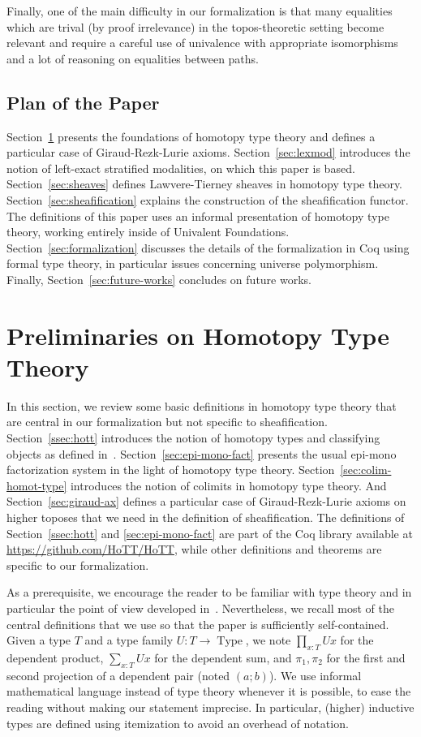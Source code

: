 \documentclass[conference]{IEEEtran}
\DeclareMathOperator{\Type}{Type}
\begin{document}
Finally, one of the main difficulty in our formalization is that many
equalities which are trival (by proof irrelevance) in the topos-theoretic
setting become relevant and require a careful use of univalence
with appropriate isomorphisms and a lot of reasoning on equalities
between paths.

\subsection{Plan of the Paper}

Section~\ref{sec:hott} presents the foundations of homotopy type theory
and defines a particular case of Giraud-Rezk-Lurie axioms. 
%
Section~\ref{sec:lexmod} introduces the notion of left-exact stratified
modalities, on which this paper is based.
%
Section~\ref{sec:sheaves} defines Lawvere-Tierney sheaves in homotopy
type theory.
%
Section~\ref{sec:sheafification} explains the construction of the
sheafification functor.
%
The definitions of this paper uses an informal presentation of
homotopy type theory, working entirely inside of Univalent
Foundations. 
Section~\ref{sec:formalization} discusses the details of the
formalization in Coq using formal type theory, in particular issues
concerning universe polymorphism.
%
Finally, Section~\ref{sec:future-works} concludes on future works.


\section{Preliminaries on Homotopy Type Theory}
\label{sec:hott}

In this section, we review some basic definitions in homotopy type
theory that are central in our formalization but not specific to
sheafification. 
%
Section~\ref{ssec:hott} introduces the notion of homotopy types and
classifying objects as defined in~\cite{sets_in_hott}.
%
Section~\ref{sec:epi-mono-fact} presents the usual epi-mono
factorization system in the light of homotopy type theory.
%
Section~\ref{sec:colim-homot-type} introduces the notion of colimits
in homotopy type theory. 
%
And Section~\ref{sec:giraud-ax} defines a particular case of
Giraud-Rezk-Lurie axioms on higher toposes that we need in the
definition of sheafification.
%
The definitions of Section~\ref{ssec:hott} and \ref{sec:epi-mono-fact}
are part of the Coq library
available at \url{https://github.com/HoTT/HoTT}, while other definitions
and theorems are specific to our formalization. 

As a prerequisite, we encourage the reader to be familiar with type theory and
in particular the point of view developed
in~\cite{hottbook}. Nevertheless, we recall most of the central definitions 
that we use so that the paper is sufficiently self-contained.
%
Given a type $T$ and a type family $U : T \to \Type$, we note
$\prod_{x:T} U x$ for the dependent product, $\sum_{x:T} U x$ for the dependent
sum, and $\pi_1, \pi_2$ for the first and second projection of a
dependent pair (noted $(a;b)$). We use informal mathematical language
instead of type theory whenever it is possible, to ease the reading
without making our statement imprecise. In particular, (higher)
inductive types are defined using itemization to avoid an overhead of
notation.
 
\end{document}
